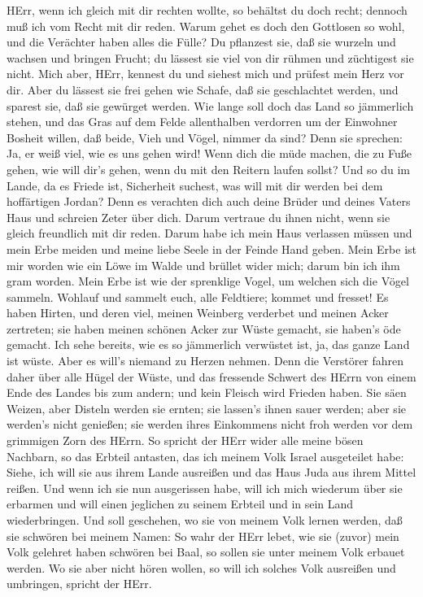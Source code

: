 HErr, wenn ich gleich mit dir rechten wollte, so behältst
du doch recht; dennoch muß ich vom Recht mit dir reden. Warum gehet es
doch den Gottlosen so wohl, und die Verächter haben alles die Fülle?
 Du pflanzest sie, daß sie wurzeln und wachsen und bringen
Frucht; du lässest sie viel von dir rühmen und züchtigest sie nicht.
 Mich aber, HErr, kennest du und siehest mich und prüfest
mein Herz vor dir. Aber du lässest sie frei gehen wie Schafe, daß sie
geschlachtet werden, und sparest sie, daß sie gewürget werden.
 Wie lange soll doch das Land so jämmerlich stehen, und das
Gras auf dem Felde allenthalben verdorren um der Einwohner Bosheit
willen, daß beide, Vieh und Vögel, nimmer da sind? Denn sie sprechen:
Ja, er weiß viel, wie es uns gehen wird!  Wenn dich die müde
machen, die zu Fuße gehen, wie will dir's gehen, wenn du mit den Reitern
laufen sollst? Und so du im Lande, da es Friede ist, Sicherheit suchest,
was will mit dir werden bei dem hoffärtigen Jordan?  Denn es
verachten dich auch deine Brüder und deines Vaters Haus und schreien
Zeter über dich. Darum vertraue du ihnen nicht, wenn sie gleich
freundlich mit dir reden.  Darum habe ich mein Haus
verlassen müssen und mein Erbe meiden und meine liebe Seele in der
Feinde Hand geben.  Mein Erbe ist mir worden wie ein Löwe im
Walde und brüllet wider mich; darum bin ich ihm gram worden.
 Mein Erbe ist wie der sprenklige Vogel, um welchen sich die
Vögel sammeln. Wohlauf und sammelt euch, alle Feldtiere; kommet und
fresset!  Es haben Hirten, und deren viel, meinen Weinberg
verderbet und meinen Acker zertreten; sie haben meinen schönen Acker zur
Wüste gemacht, sie haben's öde gemacht.  Ich sehe bereits,
wie es so jämmerlich verwüstet ist, ja, das ganze Land ist wüste. Aber
es will's niemand zu Herzen nehmen.  Denn die Verstörer
fahren daher über alle Hügel der Wüste, und das fressende Schwert des
HErrn von einem Ende des Landes bis zum andern; und kein Fleisch wird
Frieden haben.  Sie säen Weizen, aber Disteln werden sie
ernten; sie lassen's ihnen sauer werden; aber sie werden's nicht
genießen; sie werden ihres Einkommens nicht froh werden vor dem
grimmigen Zorn des HErrn.  So spricht der HErr wider alle
meine bösen Nachbarn, so das Erbteil antasten, das ich meinem Volk
Israel ausgeteilet habe: Siehe, ich will sie aus ihrem Lande ausreißen
und das Haus Juda aus ihrem Mittel reißen.  Und wenn ich
sie nun ausgerissen habe, will ich mich wiederum über sie erbarmen und
will einen jeglichen zu seinem Erbteil und in sein Land wiederbringen.
 Und soll geschehen, wo sie von meinem Volk lernen werden,
daß sie schwören bei meinem Namen: So wahr der HErr lebet, wie sie
(zuvor) mein Volk gelehret haben schwören bei Baal, so sollen sie unter
meinem Volk erbauet werden.  Wo sie aber nicht hören
wollen, so will ich solches Volk ausreißen und umbringen, spricht der
HErr.

